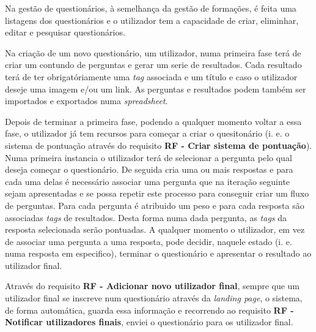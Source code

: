 Na gestão de questionários, à semelhança da gestão de formações, é feita uma listagens dos questionários e o utilizador tem a capacidade de criar, eliminhar, editar e pesquisar questionários.

Na criação de um novo questionário, um utilizador, numa primeira fase 
terá de criar um contundo de perguntas e gerar um serie de resultados. Cada resultado terá de ter obrigatóriamente uma \textit{tag} associada e um título e caso o utilizador deseje uma imagem e/ou um link. As perguntas e resultados podem também ser importados e exportados numa \textit{spreadsheet}.

Depois de terminar a primeira fase, podendo a qualquer momento voltar a essa fase, o utilizador já tem recursos para começar a criar o quesitonário (i. e. o sistema de pontuação através do requisito \textbf{RF - Criar sistema de pontuação}). Numa primeira instancia o utilizador terá de selecionar a pergunta pelo qual deseja começar o questionário. De seguida cria uma ou mais respostas e para cada uma delas é necessário associar uma pergunta que na iteração seguinte sejam apresentadas e se possa repetir este processo para conseguir criar um fluxo de perguntas. Para cada pergunta é atribuido um peso e para cada resposta são associadas \textit{tags} de resultados. Desta forma numa dada pergunta, as \textit{tags} da resposta selecionada serão pontuadas.
 A qualquer momento o utilizador, em vez de associar uma pergunta a uma resposta, pode decidir, naquele estado (i. e. numa resposta em especifico), terminar o questionário e apresentar o resultado ao utilizador final. 

Através do requisito \textbf{RF - Adicionar novo utilizador final}, sempre que um utilizador final se inscreve num questionário através da \textit{landing page}, o sistema, de forma automática, guarda essa informação e recorrendo ao requisito \textbf{RF - Notificar utilizadores finais}, enviei o questionário para os utilizador final.


